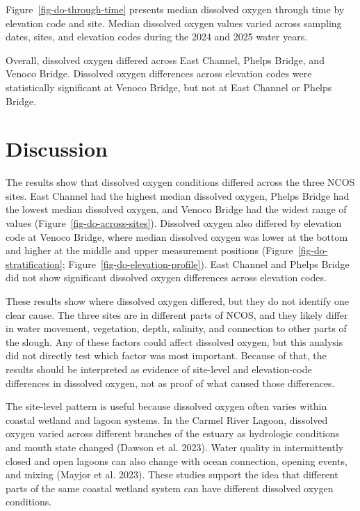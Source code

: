 \documentclass[
  letterpaper,
  DIV=11,
  numbers=noendperiod]{scrartcl}
\begin{document}
Figure~\ref{fig-do-through-time} presents median dissolved oxygen
through time by elevation code and site. Median dissolved oxygen values
varied across sampling dates, sites, and elevation codes during the 2024
and 2025 water years.

Overall, dissolved oxygen differed across East Channel, Phelps Bridge,
and Venoco Bridge. Dissolved oxygen differences across elevation codes
were statistically significant at Venoco Bridge, but not at East Channel
or Phelps Bridge.

\section{Discussion}\label{discussion}

The results show that dissolved oxygen conditions differed across the
three NCOS sites. East Channel had the highest median dissolved oxygen,
Phelps Bridge had the lowest median dissolved oxygen, and Venoco Bridge
had the widest range of values (Figure~\ref{fig-do-across-sites}).
Dissolved oxygen also differed by elevation code at Venoco Bridge, where
median dissolved oxygen was lower at the bottom and higher at the middle
and upper measurement positions (Figure~\ref{fig-do-stratification};
Figure~\ref{fig-do-elevation-profile}). East Channel and Phelps Bridge
did not show significant dissolved oxygen differences across elevation
codes.

These results show where dissolved oxygen differed, but they do not
identify one clear cause. The three sites are in different parts of
NCOS, and they likely differ in water movement, vegetation, depth,
salinity, and connection to other parts of the slough. Any of these
factors could affect dissolved oxygen, but this analysis did not
directly test which factor was most important. Because of that, the
results should be interpreted as evidence of site-level and
elevation-code differences in dissolved oxygen, not as proof of what
caused those differences.

The site-level pattern is useful because dissolved oxygen often varies
within coastal wetland and lagoon systems. In the Carmel River Lagoon,
dissolved oxygen varied across different branches of the estuary as
hydrologic conditions and mouth state changed (Dawson et al. 2023).
Water quality in intermittently closed and open lagoons can also change
with ocean connection, opening events, and mixing (Mayjor et al. 2023).
These studies support the idea that different parts of the same coastal
wetland system can have different dissolved oxygen conditions.
\end{document}
